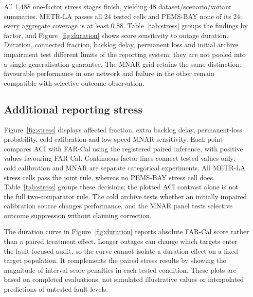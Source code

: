 All 1,488 one-factor stress stages finish, yielding 48 dataset/scenario/variant summaries. METR-LA passes all 24 tested cells and PEMS-BAY none of its 24; every aggregate coverage is at least 0.88. Table~\ref{tab:stress} groups the findings by factor, and Figure~\ref{fig:duration} shows score sensitivity to outage duration. Duration, connected fraction, backlog delay, permanent loss and initial archive impairment test different limits of the reporting system; they are not pooled into a single generalisation guarantee. The MNAR grid retains the same distinction: favourable performance in one network and failure in the other remain compatible with selective outcome observation.


\subsection{Additional reporting stress}
Figure~\ref{fig:stress} displays affected fraction, extra backlog delay, permanent-loss probability, cold calibration and low-speed MNAR sensitivity. Each point compares ACI with FAR-Cal using the registered paired inference, with positive values favouring FAR-Cal. Continuous-factor lines connect tested values only; cold calibration and MNAR are separate categorical experiments. All METR-LA stress cells pass the joint rule, whereas no PEMS-BAY stress cell does. Table~\ref{tab:stress} groups these decisions; the plotted ACI contrast alone is not the full two-comparator rule. The cold archive tests whether an initially impaired calibration source changes performance, and the MNAR panel tests selective outcome suppression without claiming correction.

The duration curve in Figure~\ref{fig:duration} reports absolute FAR-Cal score rather than a paired treatment effect. Longer outages can change which targets enter the fault-focused audit, so the curve cannot isolate a duration effect on a fixed target population. It complements the paired stress results by showing the magnitude of interval-score penalties in each tested condition. These plots are based on completed evaluations, not simulated illustrative values or interpolated predictions of untested fault levels.
